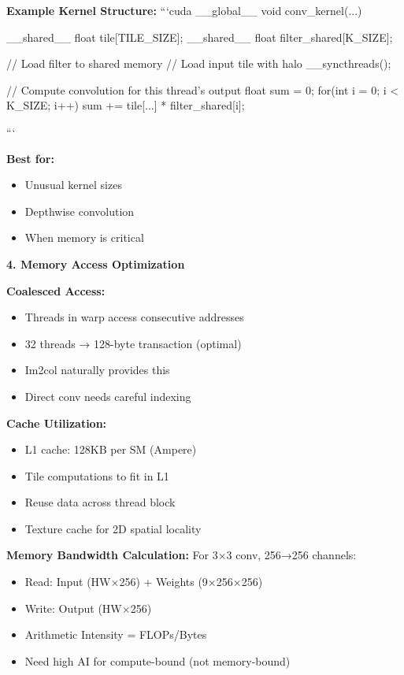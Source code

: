 \documentclass[12pt]{article}
\newcommand{\explanation}[1]{{\color{explanationcolor}#1}}
\begin{document}
\begin{enumerate}[(a)]
{{    \textbf{Example Kernel Structure:}
    ```cuda
    __global__ void conv_kernel(...) {
        __shared__ float tile[TILE_SIZE];
        __shared__ float filter_shared[K_SIZE];
        
        // Load filter to shared memory
        // Load input tile with halo
        __syncthreads();
        
        // Compute convolution for this thread's output
        float sum = 0;
        for(int i = 0; i < K_SIZE; i++)
            sum += tile[...] * filter_shared[i];
    }
    ```
    
    \textbf{Best for:}
    \begin{itemize}
        \item Unusual kernel sizes
        \item Depthwise convolution
        \item When memory is critical
    \end{itemize}
    }
    
    \textbf{4. Memory Access Optimization}
    
    \explanation{
    \textbf{Coalesced Access:}
    \begin{itemize}
        \item Threads in warp access consecutive addresses
        \item 32 threads → 128-byte transaction (optimal)
        \item Im2col naturally provides this
        \item Direct conv needs careful indexing
    \end{itemize}
    
    \textbf{Cache Utilization:}
    \begin{itemize}
        \item L1 cache: 128KB per SM (Ampere)
        \item Tile computations to fit in L1
        \item Reuse data across thread block
        \item Texture cache for 2D spatial locality
    \end{itemize}
    
    \textbf{Memory Bandwidth Calculation:}
    For 3×3 conv, 256→256 channels:
    \begin{itemize}
        \item Read: Input (HW×256) + Weights (9×256×256)
        \item Write: Output (HW×256)
        \item Arithmetic Intensity = FLOPs/Bytes
        \item Need high AI for compute-bound (not memory-bound)
    \end{itemize}
    
}}
\end{enumerate}
\end{document}
